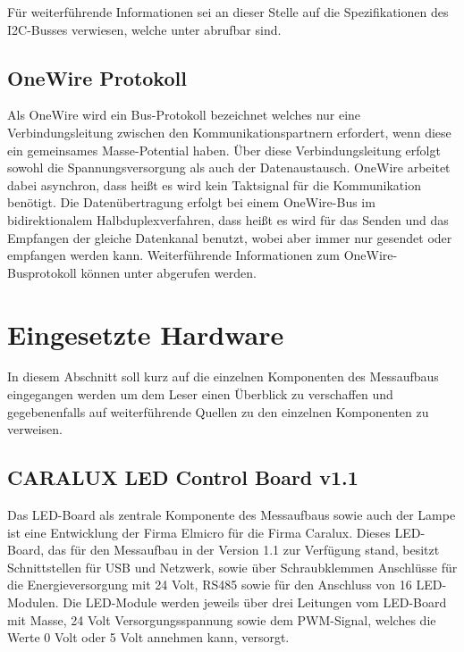 \documentclass[a4paper,12pt]{scrartcl}
\begin{document}
F\"ur weiterf\"uhrende Informationen sei an dieser Stelle auf die Spezifikationen des I2C-Busses verwiesen, welche unter \cite{speci2c} abrufbar
sind.

\subsection{OneWire Protokoll}
Als OneWire wird ein Bus-Protokoll bezeichnet welches nur eine Verbindungsleitung zwischen den Kommunikationspartnern erfordert, wenn diese ein gemeinsames
Masse-Potential haben. \"Uber diese Verbindungsleitung erfolgt sowohl die Spannungsversorgung als auch der Datenaustausch. OneWire arbeitet dabei asynchron,
dass hei\ss{}t es wird kein Taktsignal f\"ur die Kommunikation ben\"otigt. Die Daten\"ubertragung erfolgt bei einem OneWire-Bus im bidirektionalem
Halbduplexverfahren, dass hei\ss{}t es wird f\"ur das Senden und das Empfangen der gleiche Datenkanal benutzt, wobei aber immer nur gesendet oder empfangen
werden kann. Weiterf\"uhrende Informationen zum OneWire-Busprotokoll k\"onnen unter \cite{spec1wire} abgerufen werden.


\section{Eingesetzte Hardware}
In diesem Abschnitt soll kurz auf die einzelnen Komponenten des Messaufbaus eingegangen werden um dem Leser einen Überblick zu verschaffen und gegebenenfalls auf weiterführende Quellen zu den einzelnen Komponenten zu verweisen.

\subsection{CARALUX LED Control Board v1.1}

Das LED-Board als zentrale Komponente des Messaufbaus sowie auch der Lampe ist eine Entwicklung der Firma Elmicro für die Firma Caralux. Dieses LED-Board, das
für den Messaufbau in der Version 1.1 zur Verfügung stand, besitzt Schnittstellen für USB und Netzwerk, sowie über Schraubklemmen Anschlüsse für die
Energieversorgung mit 24 Volt, RS485 sowie für den Anschluss von 16 LED-Modulen. Die LED-Module werden jeweils über drei Leitungen vom LED-Board mit Masse, 24
Volt Versorgungsspannung sowie dem PWM-Signal, welches die Werte 0 Volt oder 5 Volt annehmen kann, versorgt.
\end{document}
